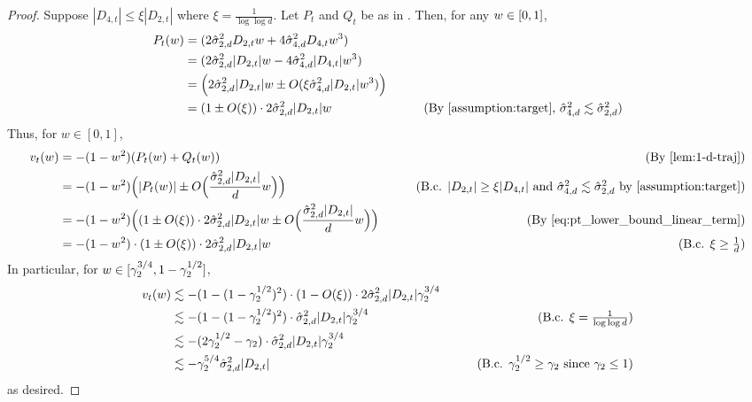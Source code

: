 \begin{proof}
Suppose $|D_{4, t}| \leq \xi |D_{2, t}|$ where $\xi = \frac{1}{\log \log d}$. Let $P_t$ and $Q_t$ be as in . Then, for any $w \in [0, 1]$,
\begin{align} \label{eq:pt_lower_bound_linear_term}
P_t(\w)
& = (2 \sigmaCoeffTwo^2 D_{2, t} \w + 4 \sigmaCoeffFour^2 D_{4, t} \w^3) \\
& = (2 \sigmaCoeffTwo^2 |D_{2, t}| \w - 4 \sigmaCoeffFour^2 |D_{4, t}| \w^3) \\
& = \Big(2 \sigmaCoeffTwo^2 |D_{2, t}| \w \pm O(\xi \sigmaCoeffFour^2 |D_{2, t}| \w^3) \Big) \\
& = (1 \pm O(\xi)) \cdot 2 \sigmaCoeffTwo^2 |D_{2, t}| \w
& \tag{By \Cref{assumption:target}, $\sigmaCoeffFour^2 \lesssim \sigmaCoeffTwo^2$}
\end{align}
Thus, for $w \in [0, 1]$,
\begin{align}
\vel_t(\w)
& = -(1 - \w^2) (P_t(\w) + Q_t(\w))
& \tag{By \Cref{lem:1-d-traj}} \\
& = -(1 - \w^2) \Big(|P_t(\w)| \pm O\Big(\frac{\sigmaCoeffTwo^2 |D_{2, t}|}{d} w\Big) \Big)
& \tag{B.c. $|D_{2, t}| \geq \xi |D_{4, t}|$ and $\sigmaCoeffFour^2 \lesssim \sigmaCoeffTwo^2$ by \Cref{assumption:target}} \\
& = -(1 - \w^2) \Big( (1 \pm O(\xi)) \cdot 2 \sigmaCoeffTwo^2 |D_{2, t}| w \pm O\Big(\frac{\sigmaCoeffTwo^2 |D_{2, t}|}{d} w\Big) \Big)
& \tag{By \Cref{eq:pt_lower_bound_linear_term}} \\
& = -(1 - \w^2) \cdot (1 \pm O(\xi)) \cdot 2 \sigmaCoeffTwo^2 |D_{2, t}| \w
& \tag{B.c. $\xi \geq \frac{1}{d}$}
\end{align}
In particular, for $w \in [\gamma_2^{3/4}, 1 - \gamma_2^{1/2}]$,
\begin{align} \label{eq:case_1_d2_big_vel_lb}
\vel_t(\w)
& \lesssim -(1 - (1 - \gamma_2^{1/2})^2) \cdot (1 - O(\xi)) \cdot 2 \sigmaCoeffTwo^2 |D_{2, t}| \gamma_2^{3/4} \\
& \lesssim -(1 - (1 - \gamma_2^{1/2})^2) \cdot \sigmaCoeffTwo^2 |D_{2, t}| \gamma_2^{3/4}
& \tag{B.c. $\xi = \frac{1}{\log \log d}$} \\
& \lesssim -(2\gamma_2^{1/2} - \gamma_2) \cdot \sigmaCoeffTwo^2 |D_{2, t}| \gamma_2^{3/4} \\
& \lesssim -\gamma_2^{5/4} \sigmaCoeffTwo^2 |D_{2, t}|
& \tag{B.c. $\gamma_2^{1/2} \geq \gamma_2$ since $\gamma_2 \leq 1$}
\end{align}
as desired.
\end{proof}

